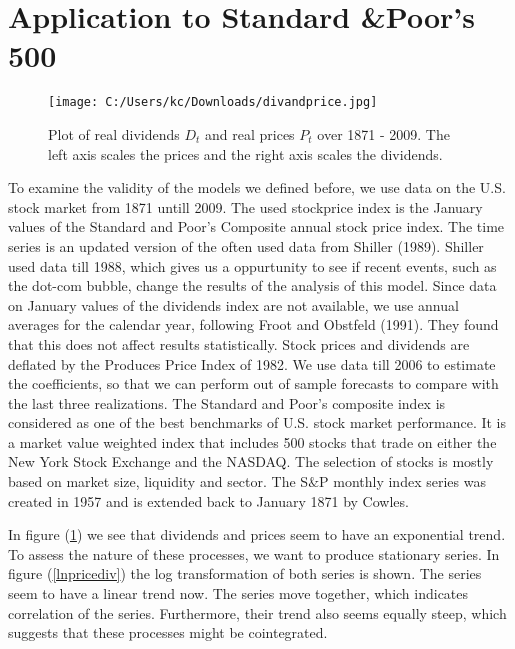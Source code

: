 \documentclass{article}
\begin{document}
\newpage
\section{Application to Standard \&Poor's 500}


\begin{figure}[h!]
	\centering
		\texttt{[image: C:/Users/kc/Downloads/divandprice.jpg]}
	\caption{Plot of real dividends $D_t$ and real prices $P_t$ over 1871 - 2009. The left axis scales the prices and the right axis scales the dividends.}
	\label{pricediv}
\end{figure}

To examine the validity of the models we defined before, we use data on the U.S. stock market from 1871 untill 2009. The used stockprice index is the January values of the Standard and Poor's Composite annual stock price index. The time series is an updated version of the often used data from Shiller (1989). Shiller used data till 1988, which gives us a oppurtunity to see if recent events, such as the dot-com bubble, change the results of the analysis of this model. Since data on January values of the dividends index are not available, we use annual averages for the calendar year, following Froot and Obstfeld (1991). They found that this does not affect results statistically\footnotemark. Stock prices and dividends are deflated by the Produces Price Index of 1982.  We use data till 2006 to estimate the coefficients, so that we can perform out of sample forecasts to compare with the last three realizations. 
The Standard and Poor's composite index is considered as one of the best benchmarks of U.S. stock market performance. It is a market value weighted index that includes 500 stocks that trade on either the New York Stock Exchange and the NASDAQ. The selection of stocks is mostly based on market size, liquidity and sector. The S$\&$P monthly index series was created in 1957 and is extended back to January 1871 by Cowles. 
\

In figure (\ref{pricediv}) we see that dividends and prices seem to have an exponential trend. To assess the nature of these processes, we want to produce stationary series. In figure (\ref{lnpricediv}) the log transformation of both series is shown. The series seem to have a linear trend now. The series move together, which indicates correlation of the series. Furthermore, their trend also seems equally steep, which suggests that these processes might be cointegrated.
\end{document}
